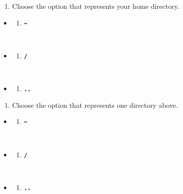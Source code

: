 \documentclass[
  letterpaper,
  DIV=11,
  numbers=noendperiod]{scrreprt}
\providecommand{\tightlist}{%
  \setlength{\itemsep}{0pt}\setlength{\parskip}{0pt}}
\begin{document}
\begin{enumerate}
\def\labelenumi{\arabic{enumi}.}
\setcounter{enumi}{4}
\tightlist
\item
  Choose the option that represents your home directory.
\end{enumerate}

\begin{itemize}
\tightlist
\item
  \begin{enumerate}
  \def\labelenumi{(\Alph{enumi})}
  \tightlist
  \item
    \textbf{\texttt{\textasciitilde{}}}\strut \\
  \end{enumerate}
\item
  \begin{enumerate}
  \def\labelenumi{(\Alph{enumi})}
  \setcounter{enumi}{1}
  \tightlist
  \item
    \textbf{\texttt{/}}\strut \\
  \end{enumerate}
\item
  \begin{enumerate}
  \def\labelenumi{(\Alph{enumi})}
  \setcounter{enumi}{2}
  \tightlist
  \item
    \textbf{\texttt{..}}
  \end{enumerate}
\end{itemize}

\begin{enumerate}
\def\labelenumi{\arabic{enumi}.}
\setcounter{enumi}{5}
\tightlist
\item
  Choose the option that represents one directory above.
\end{enumerate}

\begin{itemize}
\tightlist
\item
  \begin{enumerate}
  \def\labelenumi{(\Alph{enumi})}
  \tightlist
  \item
    \textbf{\texttt{\textasciitilde{}}}\strut \\
  \end{enumerate}
\item
  \begin{enumerate}
  \def\labelenumi{(\Alph{enumi})}
  \setcounter{enumi}{1}
  \tightlist
  \item
    \textbf{\texttt{/}}\strut \\
  \end{enumerate}
\item
  \begin{enumerate}
  \def\labelenumi{(\Alph{enumi})}
  \setcounter{enumi}{2}
  \tightlist
  \item
    \textbf{\texttt{..}}
  \end{enumerate}
\end{itemize}
\end{document}
